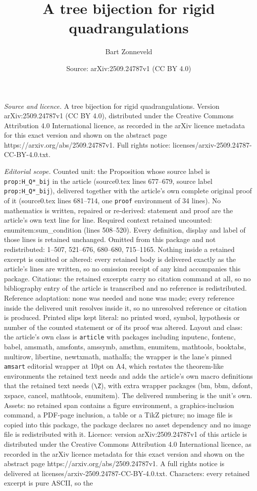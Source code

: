 \documentclass[10pt,a4paper]{amsart}
\title[A tree bijection for rigid quadrangulations]{A tree bijection for rigid quadrangulations}
\author{Bart Zonneveld}
\date{Source: arXiv:2509.24787v1 (CC BY 4.0)}
\begin{document}
\maketitle

\noindent\emph{Source and licence.} A tree bijection for rigid quadrangulations. Version arXiv:2509.24787v1 (CC BY 4.0), distributed under the Creative Commons Attribution 4.0 International licence, as recorded in the arXiv licence metadata for this exact version and shown on the abstract page https://arxiv.org/abs/2509.24787v1. Full rights notice: licenses/arxiv-2509.24787-CC-BY-4.0.txt.\par\smallskip

\noindent\textit{Editorial scope.} Counted unit: the Proposition whose source label is \texttt{prop:H\_Q*\_bij} in the article (source0.tex lines 677--679, source label \texttt{prop:H\_Q*\_bij}), delivered together with the article's own complete original proof of it (source0.tex lines 681--714, one \texttt{proof} environment of 34 lines). No mathematics is written, repaired or re-derived: statement and proof are the article's own text line for line. Required context retained uncounted: enumitem:sum\_condition (lines 508--520). Every definition, display and label of those lines is retained unchanged. Omitted from this package and not redistributed: 1--507, 521--676, 680--680, 715--1165. Nothing inside a retained excerpt is omitted or altered: every retained body is delivered exactly as the article's lines are written, so no omission receipt of any kind accompanies this package. Citations: the retained excerpts carry no citation command at all, so no bibliography entry of the article is transcribed and no reference is redistributed. Reference adaptation: none was needed and none was made; every reference inside the delivered unit resolves inside it, so no unresolved reference or citation is produced. Printed slips kept literal: no printed word, symbol, hypothesis or number of the counted statement or of its proof was altered. Layout and class: the article's own class is \texttt{article} with packages including inputenc, fontenc, babel, amsmath, amsfonts, amssymb, amsthm, enumitem, mathtools, booktabs, multirow, libertine, newtxmath, mathalfa; the wrapper is the lane's pinned \texttt{amsart} editorial wrapper at 10pt on A4, which restates the theorem-like environments the retained text needs and adds the article's own macro definitions that the retained text needs (\texttt{\textbackslash Z}), with extra wrapper packages (bm, bbm, dsfont, xspace, cancel, mathtools, enumitem). The delivered numbering is the unit's own. Assets: no retained span contains a figure environment, a graphics-inclusion command, a PDF-page inclusion, a table or a TikZ picture; no image file is copied into this package, the package declares no asset dependency and no image file is redistributed with it. Licence: version arXiv:2509.24787v1 of this article is distributed under the Creative Commons Attribution 4.0 International licence, as recorded in the arXiv licence metadata for this exact version and shown on the abstract page https://arxiv.org/abs/2509.24787v1. A full rights notice is delivered at licenses/arxiv-2509.24787-CC-BY-4.0.txt. Characters: every retained excerpt is pure ASCII, so the 
\end{document}
